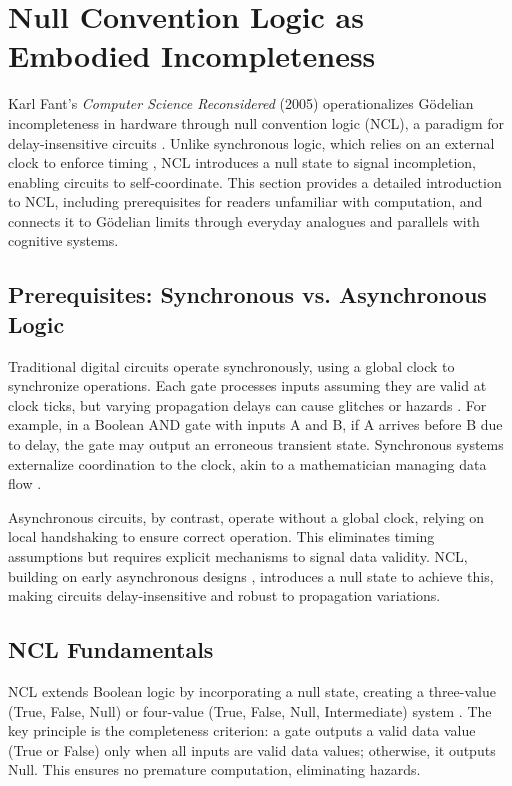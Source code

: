 \documentclass{article}
\begin{document}
\section{Null Convention Logic as Embodied Incompleteness}
\label{sec:ncl}
Karl Fant's \textit{Computer Science Reconsidered} (2005) operationalizes G\"{o}delian incompleteness in hardware through null convention logic (NCL), a paradigm for delay-insensitive circuits \citep{fant2005}. Unlike synchronous logic, which relies on an external clock to enforce timing \citep{seitz1980}, NCL introduces a null state to signal incompletion, enabling circuits to self-coordinate. This section provides a detailed introduction to NCL, including prerequisites for readers unfamiliar with computation, and connects it to G\"{o}delian limits through everyday analogues and parallels with cognitive systems.

\subsection{Prerequisites: Synchronous vs. Asynchronous Logic}
Traditional digital circuits operate synchronously, using a global clock to synchronize operations. Each gate processes inputs assuming they are valid at clock ticks, but varying propagation delays can cause glitches or hazards \citep{seitz1980}. For example, in a Boolean AND gate with inputs A and B, if A arrives before B due to delay, the gate may output an erroneous transient state. Synchronous systems externalize coordination to the clock, akin to a mathematician managing data flow \citep{fant2005}.

Asynchronous circuits, by contrast, operate without a global clock, relying on local handshaking to ensure correct operation. This eliminates timing assumptions but requires explicit mechanisms to signal data validity. NCL, building on early asynchronous designs \citep{seitz1980}, introduces a null state to achieve this, making circuits delay-insensitive and robust to propagation variations.

\subsection{NCL Fundamentals}
NCL extends Boolean logic by incorporating a null state, creating a three-value (True, False, Null) or four-value (True, False, Null, Intermediate) system \citep{fant2005}. The key principle is the completeness criterion: a gate outputs a valid data value (True or False) only when all inputs are valid data values; otherwise, it outputs Null. This ensures no premature computation, eliminating hazards.
\end{document}
